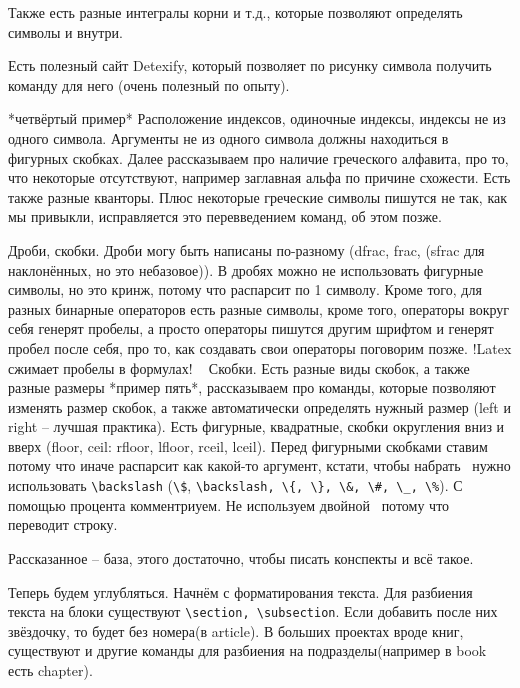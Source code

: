\documentclass[a4paper, 12pt]{article}
\begin{document}
Также есть разные интегралы корни и т.д., которые позволяют определять символы и внутри.

Есть полезный сайт Detexify, который позволяет по рисунку символа получить команду для него (очень полезный по опыту).

*четвёртый пример* Расположение индексов, одиночные индексы, индексы не из одного символа. Аргументы не из одного символа должны находиться в фигурных скобках. Далее рассказываем про наличие греческого алфавита, про то, что некоторые отсутствуют, например заглавная альфа по причине схожести. Есть также разные кванторы. Плюс некоторые греческие символы пишутся не так, как мы привыкли, исправляется это перевведением команд, об этом позже.

Дроби, скобки. Дроби могу быть написаны по-разному (dfrac, frac, (sfrac для наклонённых, но это небазовое)). В дробях можно не использовать фигурные символы, но это кринж, потому что распарсит по 1 символу. Кроме того, для разных бинарные операторов есть разные символы, кроме того, операторы вокруг себя генерят пробелы, а просто операторы пишутся другим шрифтом и генерят пробел после себя, про то, как создавать свои операторы поговорим позже. !Latex сжимает пробелы в формулах!
 
Скобки. Есть разные виды скобок, а также разные размеры *пример пять*, рассказываем про команды, которые позволяют изменять размер скобок, а также автоматически определять нужный размер (left и right – лучшая практика). Есть фигурные, квадратные, скобки округления вниз и вверх (floor, ceil: rfloor, lfloor, rceil, lceil). Перед фигурными скобками ставим \, потому что иначе распарсит как какой-то аргумент, кстати, чтобы набрать \, нужно использовать \verb|\backslash| (\verb|\$|, \verb|\backslash, \{, \}, \&, \#, \_, \%|). С помощью процента комментриуем. Не используем двойной \, потому что переводит строку.

Рассказанное – база, этого достаточно, чтобы писать конспекты и всё такое.

Теперь будем углубляться. Начнём с форматирования текста. Для разбиения текста на блоки существуют \verb|\section, \subsection|. Если добавить после них звёздочку, то будет без номера(в article). В больших проектах вроде книг, существуют и другие команды для разбиения на подразделы(например в book есть chapter).
\end{document}
